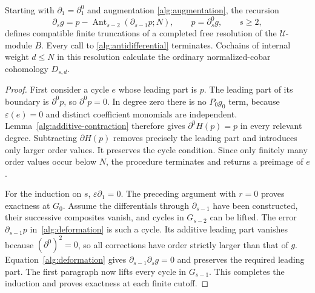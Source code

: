 \begin{proposition}\label{alg:resolution-correct}
Starting with $\partial_1=\partial^0_1$ and augmentation
\eqref{alg:augmentation}, the recursion
\begin{equation}\label{alg:deformation}
 \partial_sg=p-
   \operatorname{Ant}_{s-2}(\partial_{s-1}p;N),
 \qquad p=\partial^0_sg,\qquad s\geq2,
\end{equation}
defines compatible finite truncations of a completed free resolution
of the $\mathcal U$-module $B$.  Every call to
\eqref{alg:antidifferential} terminates.  Cochains of internal weight
$d\leq N$ in this resolution calculate the ordinary normalized-cobar
cohomology $D_{s,d}$.
\end{proposition}

\begin{proof}
First consider a cycle $e$ whose leading part is $p$.  The leading part
of its boundary is $\partial^0p$, so $\partial^0p=0$.  In degree zero
there is no $P_0g_0$ term, because $\varepsilon(e)=0$ and distinct
coefficient monomials are independent.  Lemma~\ref{alg:additive-contraction}
therefore gives $\partial^0H(p)=p$ in every relevant degree.  Subtracting
$\partial H(p)$ removes precisely the leading part and introduces only
larger order values.  It preserves the cycle condition.  Since only
finitely many order values occur below $N$, the procedure terminates
and returns a preimage of $e$.

For the induction on $s$, $\varepsilon\partial_1=0$.  The preceding
argument with $r=0$ proves exactness at $G_0$.  Assume the differentials
through $\partial_{s-1}$ have been constructed, their successive
composites vanish, and cycles in $G_{s-2}$ can be lifted.  The error
$\partial_{s-1}p$ in~\eqref{alg:deformation} is such a cycle.  Its
additive leading part vanishes because $(\partial^0)^2=0$, so all
corrections have order strictly larger than that of $g$.
Equation~\eqref{alg:deformation} gives
$\partial_{s-1}\partial_sg=0$ and preserves the required leading part.
The first paragraph now lifts every cycle in $G_{s-1}$.  This completes
the induction and proves exactness at each finite cutoff.


\end{proof}
